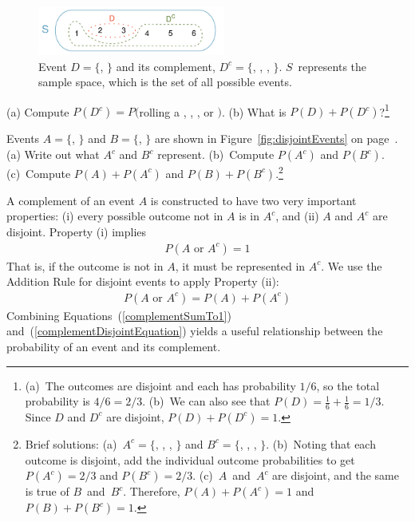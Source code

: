 \begin{figure}[hht]
\centering
\includegraphics[width=0.55\textwidth]{ch_probability_oi_biostat/figures/complementOfD/complementOfD}
\caption{Event $D=\{$, $\}$ and its complement, $D^c = \{$, , , $\}$. $S$~represents the sample space, which is the set of all possible events.}
\label{fig:complementOfD}
\end{figure}

\begin{exercise}
(a) Compute $P(D^c) = P($rolling a , , , or $)$. (b) What is $P(D) + P(D^c)$?\footnote{(a)~The outcomes are disjoint and each has probability $1/6$, so the total probability is $4/6=2/3$. (b)~We can also see that $P(D)=\frac{1}{6} + \frac{1}{6} = 1/3$. Since $D$ and $D^c$ are disjoint, $P(D) + P(D^c) = 1$.}
\end{exercise}

\begin{exercise}
Events $A=\{$, $\}$ and $B=\{$, $\}$ are shown in Figure~\ref{fig:disjointEvents} on page~\pageref{fig:disjointEvents}. (a) Write out what $A^c$ and $B^c$ represent. (b)~Compute $P(A^c)$ and $P(B^c)$. (c)~Compute $P(A)+P(A^c)$ and $P(B)+P(B^c)$.\footnote{Brief solutions: (a)~$A^c=\{$, , , $\}$ and $B^c=\{$, , , $\}$. (b)~Noting that each outcome is disjoint, add the individual outcome probabilities to get $P(A^c)=2/3$ and $P(B^c)=2/3$. (c)~$A$~and~$A^c$ are disjoint, and the same is true of $B$~and~$B^c$. Therefore, $P(A) + P(A^c) = 1$ and $P(B) + P(B^c) = 1$.}
\end{exercise}

A complement of an event $A$ is constructed to have two very important properties: (i) every possible outcome not in $A$ is in $A^c$, and (ii) $A$ and $A^c$ are disjoint. Property (i) implies
\begin{eqnarray}
P(A\text{ or }A^c) = 1
\label{complementSumTo1}
\end{eqnarray}
That is, if the outcome is not in $A$, it must be represented in $A^c$. We use the Addition Rule for disjoint events to apply Property (ii):
\begin{eqnarray}
P(A\text{ or }A^c) = P(A) + P(A^c)
\label{complementDisjointEquation}
\end{eqnarray}
Combining Equations~(\ref{complementSumTo1}) and~(\ref{complementDisjointEquation}) yields a useful relationship between the probability of an event and its complement.

